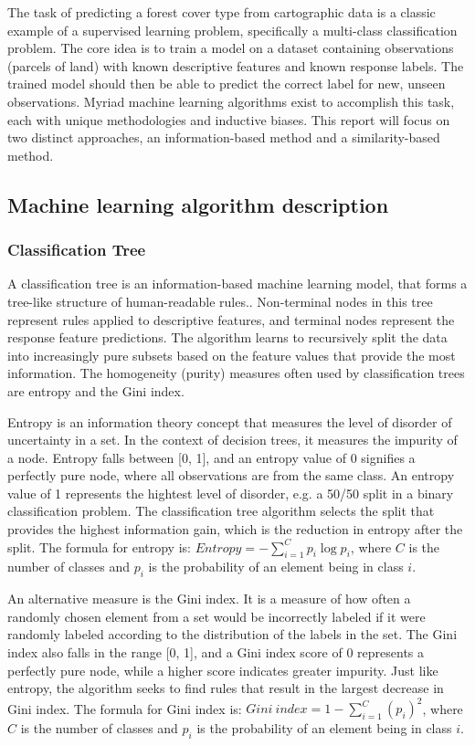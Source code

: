 \documentclass[conference]{IEEEtran}
\begin{document}
The task of predicting a forest cover type from cartographic data is a classic example of a supervised learning problem, specifically a multi-class classification problem. The core idea is to train a model on a dataset containing observations (parcels of land) with known descriptive features and known response labels. The trained model should then be able to predict the correct label for new, unseen observations. Myriad machine learning algorithms exist to accomplish this task, each with unique methodologies and inductive biases. This report will focus on two distinct approaches, an information-based method and a similarity-based method. 

\subsection{\textbf{Machine learning algorithm description}}

\subsubsection{\textbf{Classification Tree}}

A classification tree is an information-based machine learning model, that forms a tree-like structure of human-readable rules.. Non-terminal nodes in this tree represent rules applied to descriptive features, and terminal nodes represent the response feature predictions. The algorithm learns to recursively split the data into increasingly pure subsets based on the feature values that provide the most information. The homogeneity (purity) measures often used by classification trees are entropy and the Gini index.

Entropy is an information theory concept that measures the level of disorder of uncertainty in a set. In the context of decision trees, it measures the impurity of a node. Entropy falls between [0, 1], and an entropy value of 0 signifies a perfectly pure node, where all observations are from the same class. An entropy value of 1 represents the hightest level of disorder, e.g. a 50/50 split in a binary classification problem. The classification tree algorithm selects the split that provides the highest information gain, which is the reduction in entropy after the split. The formula for entropy is: $Entropy = -\sum_{i=1}^{C} p_i \log p_i$, where $C$ is the number of classes and $p_i$ is the probability of an element being in class $i$.

An alternative measure is the Gini index. It is a measure of how often a randomly chosen element from a set would be incorrectly labeled if it were randomly labeled according to the distribution of the labels in the set. The Gini index also falls in the range [0, 1], and a Gini index score of 0 represents a perfectly pure node, while a higher score indicates greater impurity. Just like entropy, the algorithm seeks to find rules that result in the largest decrease in Gini index. The formula for Gini index is: $Gini\ index = 1 - \sum_{i=1}^{C} (p_i)^2$, where $C$ is the number of classes and $p_i$ is the probability of an element being in class $i$.
\end{document}
